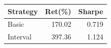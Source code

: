 {\tiny\setlength{\tabcolsep}{2pt}\begin{tabular}{lrr} \toprule
Strategy & Ret(\%) & Sharpe \\ \midrule
Basic & 170.02 & 0.719 \\ 
Interval & 397.36 & 1.124 \\ 
\bottomrule \end{tabular}}